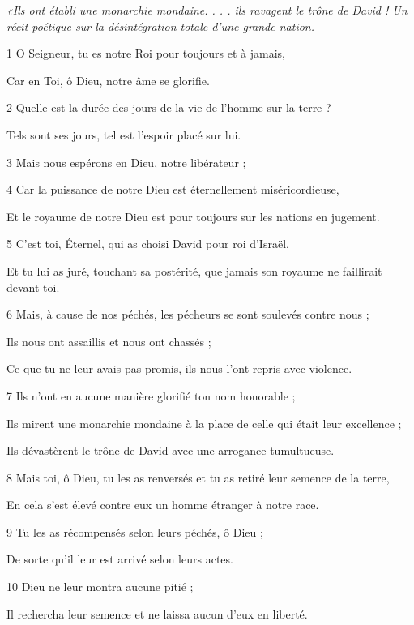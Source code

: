 
\par \textit{«Ils ont établi une monarchie mondaine. . . . ils ravagent le trône de David ! Un récit poétique sur la désintégration totale d'une grande nation.}

\par 1 O Seigneur, tu es notre Roi pour toujours et à jamais,
\par     Car en Toi, ô Dieu, notre âme se glorifie.
\par 2 Quelle est la durée des jours de la vie de l'homme sur la terre ?
\par     Tels sont ses jours, tel est l’espoir placé sur lui.
\par 3 Mais nous espérons en Dieu, notre libérateur ;
\par 4 Car la puissance de notre Dieu est éternellement miséricordieuse,
\par     Et le royaume de notre Dieu est pour toujours sur les nations en jugement.
\par   
\par 5 C'est toi, Éternel, qui as choisi David pour roi d'Israël,
\par     Et tu lui as juré, touchant sa postérité, que jamais son royaume ne faillirait devant toi.
\par 6 Mais, à cause de nos péchés, les pécheurs se sont soulevés contre nous ;
\par     Ils nous ont assaillis et nous ont chassés ;
\par     Ce que tu ne leur avais pas promis, ils nous l'ont repris avec violence.
\par 7 Ils n'ont en aucune manière glorifié ton nom honorable ;
\par     Ils mirent une monarchie mondaine à la place de celle qui était leur excellence ;
\par     Ils dévastèrent le trône de David avec une arrogance tumultueuse.
\par 8 Mais toi, ô Dieu, tu les as renversés et tu as retiré leur semence de la terre,
\par     En cela s’est élevé contre eux un homme étranger à notre race.
\par 9 Tu les as récompensés selon leurs péchés, ô Dieu ;
\par     De sorte qu'il leur est arrivé selon leurs actes.
\par 10 Dieu ne leur montra aucune pitié ;
\par     Il rechercha leur semence et ne laissa aucun d'eux en liberté.
